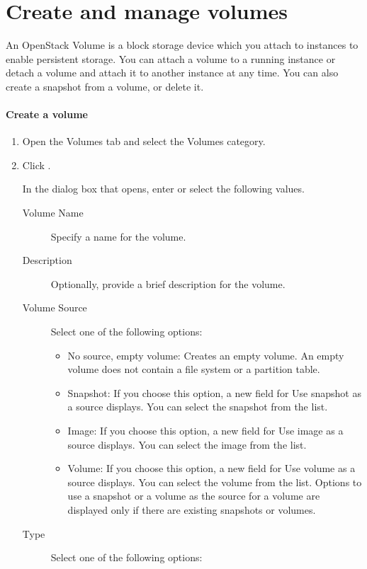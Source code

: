 \chapter{Create and manage volumes}
An \gls{OpenStack Volume} is a block storage device which you attach
to instances to enable persistent storage. You can attach a volume to
a running instance or detach a volume and attach it to another
instance at any time. You can also create a snapshot from a volume, or
delete it.

\subsubsection{Create a volume}\label{create-a-volume}
\begin{enumerate}
\item Open the Volumes tab and select the Volumes category.
\item Click .

  In the dialog box that opens, enter or select the following values.

  \begin{description}
  \item[Volume Name] Specify a name for the volume.
  \item[Description] Optionally, provide a brief description for the volume.
  \item[Volume Source] Select one of the following options:

    \begin{itemize}
    \item No source, empty volume: Creates an empty volume. An empty
      volume does not contain a file system or a partition table.
    \item Snapshot: If you choose this option, a new field for Use
      snapshot as a source displays. You can select the snapshot from
      the list.
    \item Image: If you choose this option, a new field for Use image
      as a source displays. You can select the image from the list.
    \item Volume: If you choose this option, a new field for Use
      volume as a source displays. You can select the volume from the
      list. Options to use a snapshot or a volume as the source for a
      volume are displayed only if there are existing snapshots or
      volumes.
    \end{itemize}
  \item[Type] Select one of the following options:


\end{description}
\end{enumerate}
